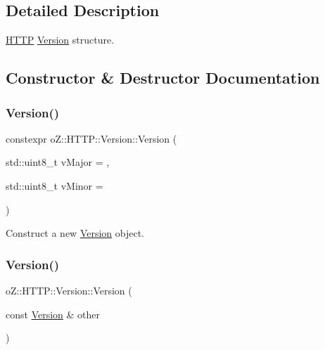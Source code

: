 \subsection{Detailed Description}
\mbox{\hyperlink{namespaceo_z_1_1_h_t_t_p}{H\+T\+TP}} \mbox{\hyperlink{structo_z_1_1_h_t_t_p_1_1_version}{Version}} structure. 

\subsection{Constructor \& Destructor Documentation}
\mbox{\label{structo_z_1_1_h_t_t_p_1_1_version_a3531840398b7bd19cf9196792f81f23d}} 
\subsubsection{\texorpdfstring{Version()}{Version()}\hspace{0.1cm}{\footnotesize\ttfamily [1/2]}}
{\footnotesize\ttfamily constexpr o\+Z\+::\+H\+T\+T\+P\+::\+Version\+::\+Version (\begin{DoxyParamCaption}\item[{std\+::uint8\+\_\+t}]{v\+Major = {},  }\item[{std\+::uint8\+\_\+t}]{v\+Minor = {} }\end{DoxyParamCaption})\hspace{0.3cm}{\ttfamily [inline]}}



Construct a new \mbox{\hyperlink{structo_z_1_1_h_t_t_p_1_1_version}{Version}} object. 

\mbox{\label{structo_z_1_1_h_t_t_p_1_1_version_a88ccde399b6f5311dac079843da8dae1}} 
\subsubsection{\texorpdfstring{Version()}{Version()}\hspace{0.1cm}{\footnotesize\ttfamily [2/2]}}
{\footnotesize\ttfamily o\+Z\+::\+H\+T\+T\+P\+::\+Version\+::\+Version (\begin{DoxyParamCaption}\item[{const \mbox{\hyperlink{structo_z_1_1_h_t_t_p_1_1_version}{Version}} \&}]{other }\end{DoxyParamCaption})\hspace{0.3cm}{\ttfamily [default]}}



